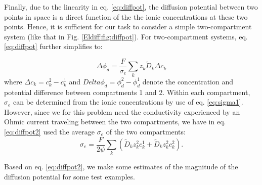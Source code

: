Finally, due to the linearity in eq. \ref{eq:diffpot}, the diffusion potential between two points in space is a direct function of the the ionic concentrations at these two points. Hence, it is sufficient for our task to consider a simple two-compartment system (like that in Fig. \ref{Eldiff:fig:diffpot}). For two-compartment systems, eq. \ref{eq:diffpot} further simplifies to:

\begin{equation}
\Delta \phi_d = \frac{F}{\bar{\sigma_e}} \sum_k{z_k \tilde{D}_k \Delta c_k}
\label{eq:diffpot2}
\end{equation}
where $\Delta c_k = c_{k}^{2} - c_{k}^{1}$ and $Delta \phi_d = \phi_d^{2} - \phi_d^{1}$ denote the concentration and potential difference between compartments 1 and 2. Within each compartment, $\sigma_e$ can be determined from the ionic concentrations by use of eq. \ref{eq:sigma1}. However, since we for this problem need the conductivity experienced by an Ohmic current traveling between the two compartments, we have in eq. \ref{eq:diffpot2} used the average $\sigma_e$ of the two compartments:
\begin{equation}
\sigma_e = \frac{F}{2\psi}\sum_{k} \left(\tilde{D}_k z_{k}^2 c_{k}^{1} + \tilde{D}_k z_{k}^2 c_{k}^{2} \right).
\label{eq:sigma2}
\end{equation}

Based on eq. \ref{eq:diffpot2}, we make some estimates of the magnitude of the diffusion potential for some test examples.

